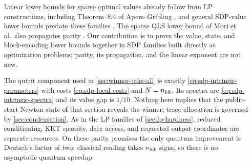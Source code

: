 Linear lower bounds for sparse optimal values already follow
from LP constructions, including Theorem~8.4 of Apers--Gribling
\cite{apers2026-quantum-speedups-linear-programming-interior}, and general
SDP-value lower bounds predate these families
\cite{apeldoorn2020-quantum-sdp-solvers}.  The sparse QLS lower bound of
Mori et al.\ also propagates parity
\cite{mori2026-sparsity-dependent-complexity-lower-bound}.  Our contribution
is to prove the value, state, and block-encoding lower bounds together in SDP
families built directly as optimization problems; parity, its propagation,
and the linear exponent are not new.

The qutrit component used in \cref{sec:winner-take-all} is exactly
\eqref{eq:sdp-intrinsic-parameters} with costs \eqref{eq:sdp-local-costs}
and \(N=n_{\rm bit}\).  Its spectra are
\eqref{eq:sdp-intrinsic-spectra} and its value gap is $1/10$.  Nothing here
implies that the public-start Newton state of that section reveals the
winner; trace allocation is governed by \cref{sec:condensation}.  As in the LP families of \cref{sec:lp-hardness},
reduced conditioning, KKT sparsity, data access, and requested output
coordinates are separate resources.  On these parity promises the
only quantum improvement is Deutsch's factor of two; classical reading takes
$n_{\rm bit}$ signs, so there is no asymptotic quantum speedup.
